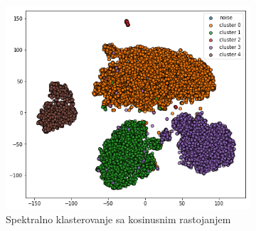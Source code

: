 \documentclass[a4paper]{article}
\begin{document}
	
\begin{figure}[H]
	\begin{subfigure}{0.5\textwidth}
	\centering
	\includegraphics[width=\textwidth]{spektral_nmf_grp1_cosine_bar}	
	\caption{Spektralno klasterovanje sa kosinusnim rastojanjem}
	\label{spektral_nmf_grp1_cosine_bar}
	\end{subfigure}
	~
	\begin{subfigure}{0.5\textwidth}
	\centering

\end{subfigure}
\end{figure}
\end{document}
